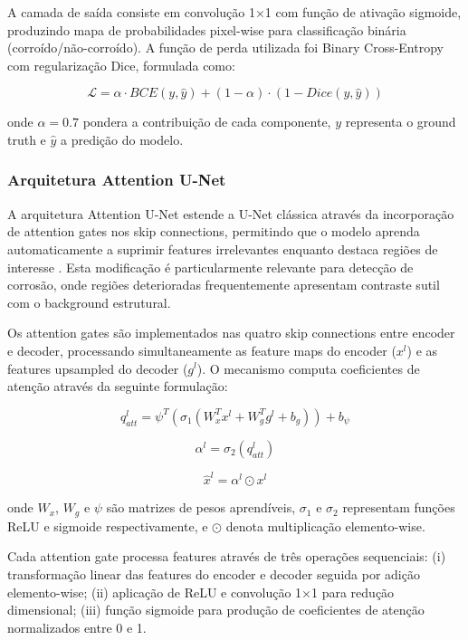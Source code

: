\documentclass[12pt,a4paper,twoside]{article}
\begin{document}
A camada de saída consiste em convolução 1×1 com função de ativação sigmoide, produzindo mapa de probabilidades pixel-wise para classificação binária (corroído/não-corroído). A função de perda utilizada foi Binary Cross-Entropy com regularização Dice, formulada como:

\begin{equation}
\mathcal{L} = \alpha \cdot BCE(y, \hat{y}) + (1-\alpha) \cdot (1 - Dice(y, \hat{y}))
\end{equation}

onde $\alpha = 0.7$ pondera a contribuição de cada componente, $y$ representa o ground truth e $\hat{y}$ a predição do modelo.

\subsubsection{Arquitetura Attention U-Net}
\label{subsubsec:attention_unet}

A arquitetura Attention U-Net estende a U-Net clássica através da incorporação de attention gates nos skip connections, permitindo que o modelo aprenda automaticamente a suprimir features irrelevantes enquanto destaca regiões de interesse \cite{oktay2018attention}. Esta modificação é particularmente relevante para detecção de corrosão, onde regiões deterioradas frequentemente apresentam contraste sutil com o background estrutural.

Os attention gates são implementados nas quatro skip connections entre encoder e decoder, processando simultaneamente as feature maps do encoder ($x^l$) e as features upsampled do decoder ($g^l$). O mecanismo computa coeficientes de atenção através da seguinte formulação:

\begin{equation}
q_{att}^l = \psi^T(\sigma_1(W_x^T x^l + W_g^T g^l + b_g)) + b_{\psi}
\end{equation}

\begin{equation}
\alpha^l = \sigma_2(q_{att}^l)
\end{equation}

\begin{equation}
\hat{x}^l = \alpha^l \odot x^l
\end{equation}

onde $W_x$, $W_g$ e $\psi$ são matrizes de pesos aprendíveis, $\sigma_1$ e $\sigma_2$ representam funções ReLU e sigmoide respectivamente, e $\odot$ denota multiplicação elemento-wise.

Cada attention gate processa features através de três operações sequenciais: (i) transformação linear das features do encoder e decoder seguida por adição elemento-wise; (ii) aplicação de ReLU e convolução 1×1 para redução dimensional; (iii) função sigmoide para produção de coeficientes de atenção normalizados entre 0 e 1.
\end{document}
